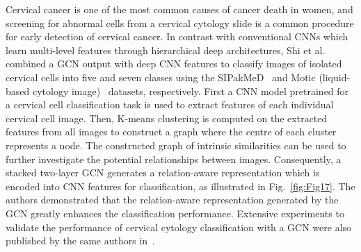 Cervical cancer is one of the most common causes of cancer death in women, and screening for abnormal cells from a cervical cytology slide is a common procedure for early detection of cervical cancer. 
In contrast with conventional CNNs which learn multi-level features through hierarchical deep architectures, Shi et al.{~} combined a GCN output with deep CNN features to classify images of isolated cervical cells into five and seven classes using the SIPakMeD~ and Motic (liquid-based cytology image)~ datasets, respectively. 
First a CNN model pretrained for a cervical cell classification task is used to extract features of each individual cervical cell image. Then, K-means clustering is computed on the extracted features from all images to construct a graph where the centre of each cluster represents a node. The constructed graph of intrinsic similarities can be used to further investigate the potential relationships between images.
Consequently, a stacked two-layer GCN generates a relation-aware representation which is encoded into CNN features for classification, as illustrated in Fig.~\ref{fig:Fig17}. 
The authors demonstrated that the relation-aware representation generated by the GCN greatly enhances the classification performance.
Extensive experiments to validate the performance of cervical cytology classification with a GCN were also published by the same authors in~.

